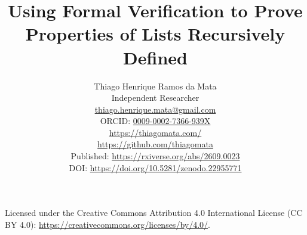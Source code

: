 \documentclass[11pt]{article}
\title{Using Formal Verification to Prove Properties of Lists Recursively Defined}
\author{%
  Thiago Henrique Ramos da Mata\\
  \small Independent Researcher\\
  \small \href{mailto:thiago.henrique.mata@gmail.com}{thiago.henrique.mata@gmail.com}\\
  \small ORCID: \href{https://orcid.org/0009-0002-7366-939X}{0009-0002-7366-939X}\\
  \small \url{https://thiagomata.com/}\\
  \small \url{https://github.com/thiagomata}\\
  \small Published: \url{https://rxiverse.org/abs/2609.0023}\\
  \small DOI: \url{https://doi.org/10.5281/zenodo.22955771}
}
\date{}
\begin{document}
\maketitle



\begin{center}
  \small Licensed under the Creative Commons Attribution 4.0 International
  License (CC BY 4.0): \url{https://creativecommons.org/licenses/by/4.0/}.
\end{center}






























\appendix

\end{document}
